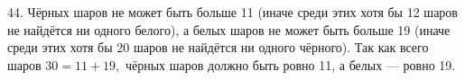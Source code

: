 44. Чёрных шаров не может быть больше 11 (иначе среди этих хотя бы 12 шаров не найдётся ни одного белого), а белых шаров не может быть больше 19 (иначе среди этих хотя бы 20 шаров не найдётся ни одного чёрного). Так как всего шаров $30=11+19,$ чёрных шаров должно быть ровно 11, а белых --- ровно 19.\\
